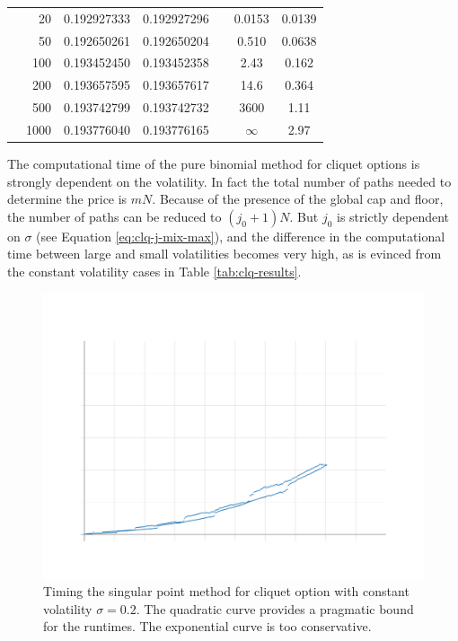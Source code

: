 \begin{table}[h]
\begin{tabular}{rrccccc}
		&    20  &  0.192927333  &  0.192927296  &    &  0.0153  &  0.0139  \\
		&    50  &  0.192650261  &  0.192650204  &    &  0.510  &  0.0638  \\
		&   100  &  0.193452450  &  0.193452358  &    &  2.43  &  0.162  \\
		&   200  &  0.193657595  &  0.193657617  &    &  14.6  &  0.364  \\
		&   500  &  0.193742799  &  0.193742732  &    &  3600  &  1.11  \\
		&  1000  &  0.193776040  &  0.193776165  &    &  $ \infty $  &  2.97  \\
		\bottomrule
	\end{tabular}
\end{table}


\begin{rem}
	The computational time of the pure binomial method for cliquet options is strongly dependent on the volatility. In fact the total number of paths needed to determine the price is $ m N $. Because of the presence of the global cap and floor, the number of paths can be reduced to $ (j_0 + 1) N $. But $ j_0 $ is strictly dependent on $ \sigma $ (see Equation \ref{eq:clq-j-mix-max}), and the difference in the computational time between large and small volatilities becomes very high, as is evinced from the constant volatility cases in Table \ref{tab:clq-results}.
\end{rem}


\begin{figure}[h]
	\centering
	\includegraphics[width=\linewidth]{img/timing-cliquet}
	\caption[Timing -- cliquet]{Timing the singular point method for cliquet option with constant volatility $ \sigma = 0.2 $. The quadratic curve provides a pragmatic bound for the runtimes. The exponential curve is too conservative.}
	\label{fig:clq-timing}
\end{figure}


